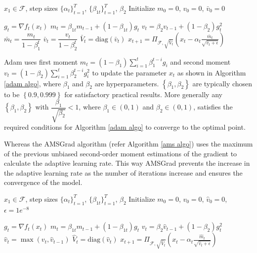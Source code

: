 \documentclass[12pt]{article}
\begin{document}
\begin{algorithm}[H]
\caption{Adam}
\label{adam algo}
\begin{algorithmic}[1]

\Require $x_1 \in \mathcal{F}$, step sizes $\{\alpha_t\}_{t=1}^T$, $\{\beta_{1t}\}_{t=1}^T$, $\beta_2$
\State Initialize $m_0 = 0$, $v_0 = 0$, $\bar{v}_0 = 0$

    \Statex $g_t = \nabla f_t(x_t)$
    \Statex $m_t = \beta_{1t} m_{t-1} + (1 - \beta_{1t}) g_t$
    \Statex $v_t = \beta_2 v_{t-1} + (1 - \beta_2) g_t^2$
    \Statex $\bar{m}_t = \dfrac{m_t}{1 - \beta_1^t}$
    \Statex $\bar{v}_t = \dfrac{v_t}{1 - \beta_2^t}$
    \Statex $\bar{V}_t = \mathrm{diag}(\bar{v}_t)$
    \Statex $x_{t+1} = \Pi_{\mathcal{F}, \sqrt{\bar{V}_t}} \left( x_t - \alpha_t \frac{\bar{m}_t}{\sqrt{\bar{v}_t + \epsilon}} \right)$
\EndFor
\end{algorithmic}
\end{algorithm}
Adam uses first moment $m_{t} = (1-\beta_{1})\sum_{i=1}^{t}{\beta_{1}^{t-i}g_{i}}$ and second moment $v_{t} = (1-\beta_{2})\sum_{i=1}^{t}{\beta_{2}^{t-i}g_{i}^{2}}$ to update the parameter $x_{t}$ as shown in Algorithm \ref{adam algo}, where $\beta_{1}$ and $\beta_{2}$ are hyperparameters.  $\left\{\beta_{1}, \beta_{2}\right\}$ are typically chosen to be $\left\{0.9, 0.999\right\}$ for satisfactory practical results. More generally any  $\left\{\beta_{1}, \beta_{2}\right\}$ with $\dfrac{\beta_{1}}{\sqrt{\beta_{2}}} < 1$, where $\beta_{1} \in (0,1)$ and $\beta_{2} \in (0,1)$, satisfies the required conditions for Algorithm \ref{adam algo} to converge to the optimal point. 

Whereas the AMSGrad algorithm (refer Algorithm \ref{ams algo}) uses the maximum of the previous unbiased second-order moment estimations of the gradient to calculate the adaptive learning rate. This way AMSGrad prevents the increase in the adaptive learning rate as the number of iterations increase and ensures the convergence of the model. 
\begin{algorithm}[H]
\caption{AMSGrad}
\label{ams algo}
\begin{algorithmic}[1]

\Require $x_1 \in \mathcal{F}$, step sizes $\{\alpha_t\}_{t=1}^T$, $\{\beta_{1t}\}_{t=1}^T$, $\beta_2$
\State Initialize $m_0 = 0$, $v_0 = 0$, $\hat{v}_0 = 0$, $\epsilon = 1e^{-8}$

    \Statex $g_t = \nabla f_t(x_t)$
    \Statex $m_t = \beta_{1t} m_{t-1} + (1 - \beta_{1t}) g_t$
    \Statex $v_t = \beta_2 \hat{v}_{t-1} + (1 - \beta_2) g_t^2$
    \Statex $\hat{v}_t = \max(v_{t}, \hat{v}_{t-1})$
    \Statex $\hat{V}_t = \mathrm{diag}(\hat{v}_t)$
    \Statex $x_{t+1} = \Pi_{\mathcal{F}, \sqrt{\hat{V}_t}} \left( x_t - \alpha_t \frac{\hat{m}_t}{\sqrt{\hat{v}_t + \epsilon}} \right)$
\EndFor
\end{algorithmic}
\end{algorithm}
\end{document}
